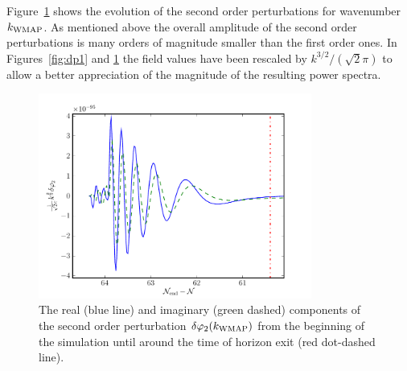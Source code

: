 Figure~\ref{fig:dp2realimag} shows the evolution of the second
order perturbations for wavenumber $k_\mathrm{WMAP}$. As mentioned above the
overall amplitude of the second order perturbations is many orders of
magnitude smaller than the first order ones. In Figures~\ref{fig:dp1}
and \ref{fig:dp2realimag} the field values have been rescaled by
$k^{3/2}/(\sqrt{2}\pi)$ to allow a better appreciation of the
magnitude of the resulting power spectra.
% 
\begin{figure}
 \centering
 \includegraphics[width=0.8\textwidth]{numerical/graphs/dp2_kwmap}
 \caption[Second Order Perturbation]{The real (blue line) and imaginary (green
dashed) components of the
second order
perturbation $\delta\varphi_{2}(k_\mathrm{WMAP})$ from the beginning of the simulation until around
the time
of horizon exit (red dot-dashed line).}
\label{fig:dp2realimag}
\end{figure}
% 



